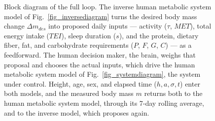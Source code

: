 \begin{figure}[htbp]
\begin{tikzpicture}
\end{tikzpicture}
\caption[Block diagram of the full loop.]{Block diagram of the full loop. The inverse human metabolic system model of Fig.~\ref{fig_inversediagram} turns the desired body mass change $\Delta m_{des}$ into proposed daily inputs — activity ($\tau$, $MET$), total energy intake ($TEI$), sleep duration ($s$), and the protein, dietary fiber, fat, and carbohydrate requirements ($P$, $F$, $G$, $C$) — as a feedforward. The human decision maker, the brain, weighs that proposal and chooses the actual inputs, which drive the human metabolic system model of Fig.~\ref{fig_systemdiagram}, the system under control. Height, age, sex, and elapsed time ($h, a, \sigma, t$) enter both models, and the measured body mass $m$ returns both to the human metabolic system model, through its 7-day rolling average, and to the inverse model, which proposes again.}
\label{fig_fullloopdiagram}
\end{figure}
